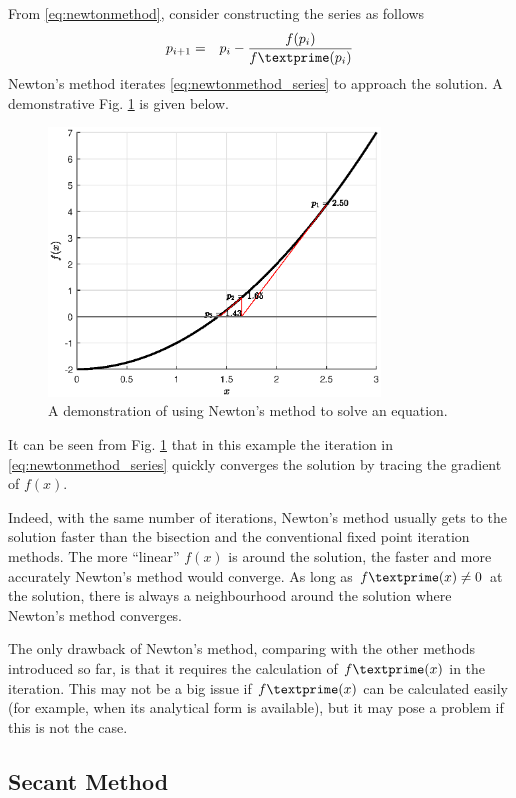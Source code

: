 From \eqref{eq:newtonmethod}, consider constructing the series as follows
\begin{eqnarray}
  p_{i+1} &=& p_i - \frac{f(p_i)}{f\textprime(p_i)} \label{eq:newtonmethod_series}
\end{eqnarray}
Newton's method iterates \eqref{eq:newtonmethod_series} to approach the solution. A demonstrative Fig. \ref{fig:part-5:newton} is given below.
\begin{figure}[!htbp]
\centering
\includegraphics[width=250pt]{chapters/part-5/figures/demo_newton.eps}
\caption{A demonstration of using Newton's method to solve an equation.} \label{fig:part-5:newton}
\end{figure}
It can be seen from Fig. \ref{fig:part-5:newton} that in this example the iteration in \eqref{eq:newtonmethod_series} quickly converges the solution by tracing the gradient of $f(x)$. 

Indeed, with the same number of iterations, Newton's method usually gets to the solution faster than the bisection and the conventional fixed point iteration methods. The more ``linear'' $f(x)$ is around the solution, the faster and more accurately Newton's method would converge. As long as $f\textprime(x)\neq 0$ at the solution, there is always a neighbourhood around the solution where Newton's method converges. 

The only drawback of Newton's method, comparing with the other methods introduced so far, is that it requires the calculation of $f\textprime(x)$ in the iteration. This may not be a big issue if $f\textprime(x)$ can be calculated easily (for example, when its analytical form is available), but it may pose a problem if this is not the case.

\subsection{Secant Method}

